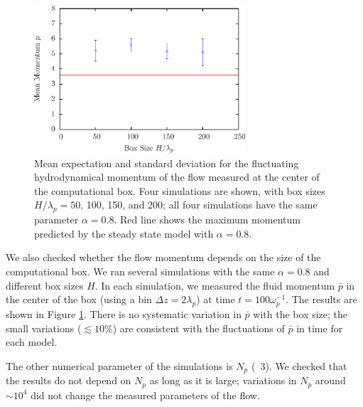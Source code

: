 \begin{figure}[h]
\begin{center}
\includegraphics[width=0.7\textwidth]{pics/chap2/f6.eps}
\caption[Mean and standard deviation of particle momentum at the center of the
simulation box]{Mean expectation and standard
  deviation for the fluctuating hydrodynamical momentum of the flow measured at
  the center of the computational box. Four simulations are shown, with box
  sizes $H/\lambda_p=50$, 100, 150, and 200; all four simulations have the same
  parameter $\alpha=0.8$. Red line shows the maximum momentum predicted by the
  steady state model with $\alpha=0.8$.}
\label{fig:zetacompare}
\end{center}
\end{figure}

We also checked whether the flow momentum depends on the size of the computational
box. We ran several simulations with the same $\alpha = 0.8$ and different box sizes
$H$. In each simulation, we measured the fluid momentum $\bar{p}$ in the center of
the box (using a bin $\Delta z=2\lambda_p$) at time $t=100\omega_p^{-1}$.
The results are shown in Figure \ref{fig:zetacompare}.
There is no systematic variation in $\bar{p}$ with the box size; the small variations
($\lesssim 10$\%) are consistent with the fluctuations of $\bar{p}$ in time for each model.

The other numerical parameter of the simulations is $N_p$ (\Sect~3). We checked
that  the results do not depend on $N_p$ as long as it is large; variations in $N_p$
around $\sim 10^4$ did not change the measured parameters of the flow.


